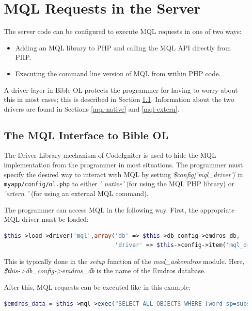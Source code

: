 \documentclass[11pt,oneside,a4paper]{memoir}
\newcommand{\q}{{\mainnolig '}}
\begin{document}
\section{MQL Requests in the Server}\label{sec-mql-server}

The server code can be configured to execute MQL requests in one of two ways:

\begin{itemize}
\item Adding an MQL library to PHP and calling the MQL API directly from PHP.
\item Executing the command line version of MQL from within PHP code.
\end{itemize}

A driver layer in Bible OL protects the programmer for having to worry about this in most cases;
this is described in Section \ref{mql-if}. Information about the two drivers are found in Sections
\ref{mql-native} and \ref{mql-extern}.


\subsection{The MQL Interface to Bible OL}\label{mql-if}

The Driver Library mechanism of CodeIgniter is used to hide the MQL implementation from the
programmer in most situations. The programmer must specify the desired way to interact with MQL by
setting \emph{\$config[\q mql\_driver\q]} in \texttt{myapp/config/ol.php} to either \emph{\q
  native\q} (for using the MQL PHP library) or \emph{\q extern \q} (for using an external MQL
command).

The programmer can access MQL in the following way. First, the appropriate MQL driver must be
loaded:

\begin{lstlisting}[language=PHP]
$this->load->driver('mql',array('db' => $this->db_config->emdros_db,
                                'driver' => $this->config->item('mql_driver')));
\end{lstlisting}

This is typically done in the \emph{setup} function of the \emph{mod\_askemdros} module. Here,
\emph{\$this->db\_config->emdros\_db} is the name of the Emdros database.

After this, MQL requests can be executed like in this example:

\begin{lstlisting}[language=PHP]
$emdros_data = $this->mql->exec("SELECT ALL OBJECTS WHERE [word sp=subs GET text] GOqxqxqx");
\end{lstlisting}
\end{document}
